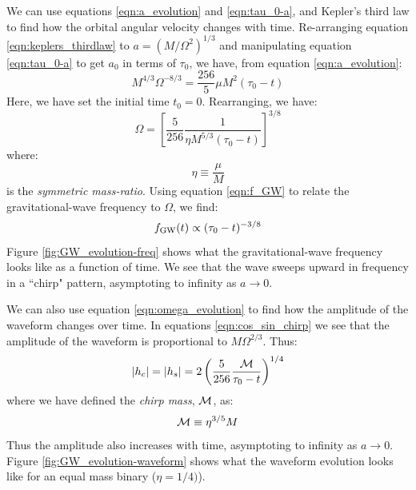 We can use equations \ref{eqn:a_evolution} and \ref{eqn:tau_0-a}, and Kepler's third law to find how the orbital angular velocity changes with time. Re-arranging equation \ref{eqn:keplers_thirdlaw} to $a = (M/\Omega^2)^{1/3}$ and manipulating equation \ref{eqn:tau_0-a} to get $a_0$ in terms of $\tau_0$, we have, from equation \ref{eqn:a_evolution}:
\begin{equation*}
M^{4/3}\Omega^{-8/3} = \frac{256}{5} \mu M^2(\tau_0 - t)
\end{equation*}
Here, we have set the initial time $t_0 = 0$. Rearranging, we have:
\begin{equation}
\label{eqn:omega_evolution}
\Omega = \left[ \frac{5}{256} \frac{1}{\eta M^{5/3}(\tau_0 - t)} \right]^{3/8}
\end{equation}
where:
\begin{equation}
\label{eqn:symmetric_mass}
\eta \equiv \frac{\mu}{M}
\end{equation}
is the \emph{symmetric mass-ratio}. Using equation \ref{eqn:f_GW} to relate the gravitational-wave frequency to $\Omega$, we find:
\begin{equation}
\label{eqn:f_evolution}
\fGW(t) \propto (\tau_0 - t)^{-3/8}
\end{equation}
Figure \ref{fig:GW_evolution-freq} shows what the gravitational-wave frequency looks like as a function of time. We see that the wave sweeps upward in frequency in a ``chirp" pattern, asymptoting to infinity as $a \rightarrow 0$.

We can also use equation \ref{eqn:omega_evolution} to find how the amplitude of the waveform changes over time. In equations \ref{eqn:cos_sin_chirp} we see that the amplitude of the waveform is proportional to $M\Omega^{2/3}$. Thus:
\begin{equation}
\label{eqn:amp_evolution}
|h_c| = |h_s| = 2 \left( \frac{5}{256} \frac{\mchirp}{\tau_0 - t} \right)^{1/4}
\end{equation}
where we have defined the \emph{chirp mass}, $\mathcal{M}$, as:
\begin{equation}
\mathcal{M} \equiv \eta^{3/5}M
\end{equation}
Thus the amplitude also increases with time, asymptoting to infinity as $a \rightarrow 0$. Figure \ref{fig:GW_evolution-waveform} shows what the waveform evolution looks like for an equal mass binary ($\eta=1/4)$).

